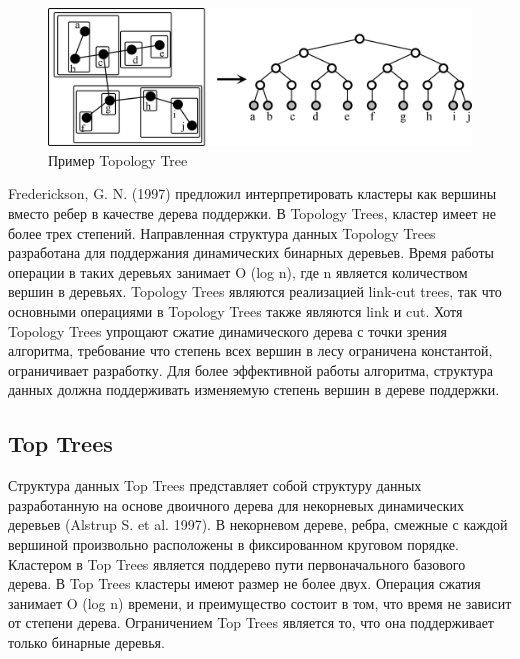 \documentclass[specification,annotation]{itmo-student-thesis}
\begin{document}
\begin{figure}[!ht]
\centering
\includegraphics[width=\textwidth]{pic/topology-tree.png}
\caption{Пример Topology Tree}\label{fig:topology-tree}
\end{figure}

Frederickson, G. N. (1997) предложил интерпретировать кластеры как вершины вместо ребер в качестве дерева поддержки. В Topology Trees, кластер имеет не более 
трех степений. Направленная структура данных Topology Trees разработана для поддержания динамических бинарных деревьев. Время работы операции в таких 
деревьях занимает O (log n), где n является количеством вершин в деревьях. Topology Trees являются реализацией link-cut trees, так что основными операциями в 
Topology Trees также являются link и cut. Хотя Topology Trees упрощают сжатие динамического дерева с точки зрения алгоритма, требование что степень всех вершин 
в лесу ограничена константой, ограничивает разработку. Для более эффективной работы алгоритма, структура данных должна поддерживать изменяемую 
степень вершин в дереве поддержки.

\subsection{Top Trees}

Структура данных Top Trees представляет собой структуру данных разработанную на основе двоичного дерева для некорневых динамических деревьев (Alstrup S. et 
al. 1997). В некорневом дереве, ребра, смежные с каждой вершиной произвольно расположены в фиксированном круговом порядке. Кластером в Top Trees является 
поддерево пути первоначального базового дерева. В Top Trees кластеры имеют размер не более двух. Операция сжатия занимает O (log n) времени, и преимущество 
состоит в том, что время не зависит от степени дерева. Ограничением Top Trees является то, что она поддерживает только бинарные деревья.
\end{document}
